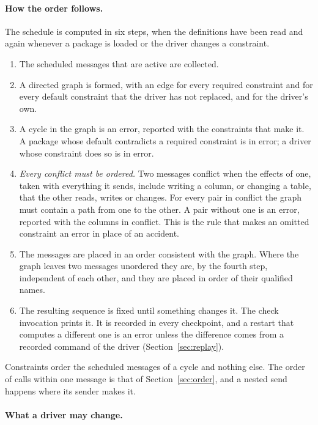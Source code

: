\documentclass[11pt,a4paper]{article}
\begin{document}
\paragraph{How the order follows.}  The schedule is computed in six steps,
when the definitions have been read and again whenever a package is loaded
or the driver changes a constraint.

\begin{enumerate}
  \item The scheduled messages that are active are collected.
  \item A directed graph is formed, with an edge for every required
        constraint and for every default constraint that the driver has not
        replaced, and for the driver's own.
  \item A cycle in the graph is an error, reported with the constraints
        that make it.  A package whose default contradicts a required
        constraint is in error; a driver whose constraint does so is in
        error.
  \item \emph{Every conflict must be ordered.}  Two messages conflict when
        the effects of one, taken with everything it sends, include writing
        a column, or changing a table, that the other reads, writes or
        changes.  For every pair in conflict the graph must contain a path
        from one to the other.  A pair without one is an error, reported
        with the columns in conflict.  This is the rule that makes an
        omitted constraint an error in place of an accident.
  \item The messages are placed in an order consistent with the graph.
        Where the graph leaves two messages unordered they are, by the
        fourth step, independent of each other, and they are placed in
        order of their qualified names.
  \item The resulting sequence is fixed until something changes it.  The
        check invocation prints it.  It is recorded in every checkpoint, and
        a restart that computes a different one is an error unless the
        difference comes from a recorded command of the driver
        (Section~\ref{sec:replay}).
\end{enumerate}

Constraints order the scheduled messages of a cycle and nothing else.  The
order of calls within one message is that of Section~\ref{sec:order}, and a
nested send happens where its sender makes it.

\paragraph{What a driver may change.}
\end{document}
